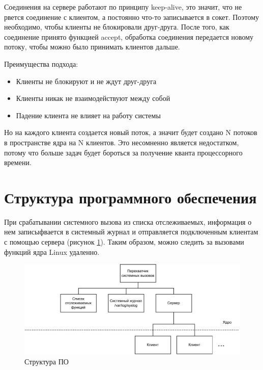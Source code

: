 Соединения на сервере работают по принципу keep-alive, это значит, что не рвется соединение с клиентом, а постоянно что-то записывается в сокет. Поэтому необходимо, чтобы клиенты не блокировали друг-друга. После того, как соединение принято функцией accept, обработка соединения передается новому потоку, чтобы можно было принимать клиентов дальше.

Преимущества подхода:
\begin{itemize}
	\item Клиенты не блокируют и не ждут друг-друга
	\item Клиенты никак не взаимодействуют между собой
	\item Падение клиента не влияет на работу системы
\end{itemize}

Но на каждого клиента создается новый поток, а значит будет создано N потоков в пространстве ядра на N клиентов. Это несомненно является недостатком, потому что больше задач будет бороться за получение кванта процессорного времени.


\section{Структура программного обеспечения}
При срабатывании системного вызова из списка отслеживаемых, информация о нем записыфвается в системный журнал и отправляется подключенным клиентам с помощью сервера (рисунок \ref{structurePO}). Таким образом, можно следить за вызовами функций ядра Linux удаленно.

\begin{figure}[h]
	\centering
	\includegraphics[width=1\textwidth]{inc/structurePO.pdf}
	\caption{Структура ПО}
	\label{structurePO}
\end{figure}


